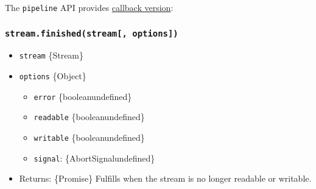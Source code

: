 The \texttt{pipeline} API provides
\hyperref[streampipelinesource-transforms-destination-callback]{callback
version}:

\subsubsection{\texorpdfstring{\texttt{stream.finished(stream{[},\ options{]})}}{stream.finished(stream{[}, options{]})}}\label{stream.finishedstream-options}

\begin{itemize}
\tightlist
\item
  \texttt{stream} \{Stream\}
\item
  \texttt{options} \{Object\}

  \begin{itemize}
  \tightlist
  \item
    \texttt{error} \{boolean\textbar undefined\}
  \item
    \texttt{readable} \{boolean\textbar undefined\}
  \item
    \texttt{writable} \{boolean\textbar undefined\}
  \item
    \texttt{signal}: \{AbortSignal\textbar undefined\}
  \end{itemize}
\item
  Returns: \{Promise\} Fulfills when the stream is no longer readable or
  writable.
\end{itemize}

\begin{Shaded}
\begin{Highlighting}[]
\OperatorTok{=} \NormalTok{(}\NormalTok{)}\OperatorTok{;}
\OperatorTok{=} \NormalTok{(}\NormalTok{)}\OperatorTok{;}

\OperatorTok{=}\NormalTok{(}\NormalTok{)}\OperatorTok{;}

  \NormalTok{() \{}
   \OperatorTok{;}
  \NormalTok{(}\NormalTok{)}\OperatorTok{;}
\NormalTok{\}}

\NormalTok{()}\NormalTok{(}\NormalTok{)}\OperatorTok{;}
\NormalTok{()}\OperatorTok{;} 
\end{Highlighting}
\end{Shaded}

